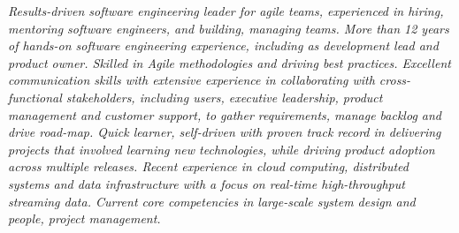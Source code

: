 {\selectfont
	\begin{justify}\textit{Results-driven software engineering leader for agile teams, experienced in hiring, mentoring software engineers, and building, managing teams. More than 12 years of hands-on software engineering experience, including as development lead and product owner. Skilled in Agile methodologies and driving best practices. Excellent communication skills with extensive experience in collaborating with cross-functional stakeholders, including users, executive leadership, product management and customer support, to gather requirements, manage backlog and drive road-map. Quick learner, self-driven with proven track record in delivering projects that involved learning new technologies, while driving product adoption across multiple releases. Recent experience in cloud computing, distributed systems and data infrastructure with a focus on real-time high-throughput streaming data. Current core competencies in large-scale system design and people, project management.}\end{justify}
}
